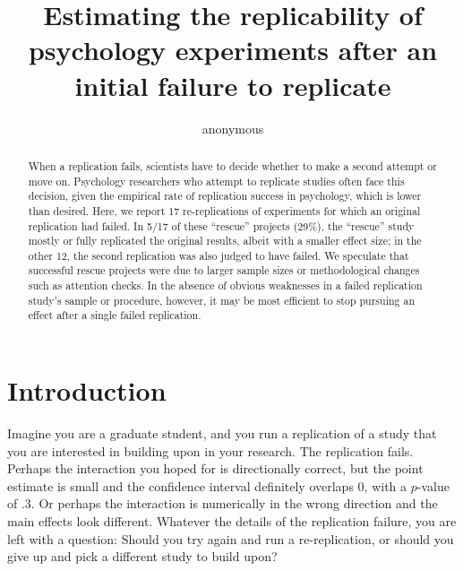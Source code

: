 \documentclass[
  english,
  a4paper,
]{article}
\title{Estimating the replicability of psychology experiments after an initial failure to replicate}
\affil[\addrlblbycode{#1}]{\MyRef{ADDRTXT}{#1}}}%
\author{anonymous}
\date{}
\begin{document}
\maketitle





\begin{otherlanguage}{english}

\begin{abstract}
When a replication fails, scientists have to decide whether to make a second attempt or move on.
Psychology researchers who attempt to replicate studies often face this decision, given the empirical rate of replication success in psychology, which is lower than desired.
Here, we report 17 re-replications of experiments for which an original replication had failed.
In 5/17 of these ``rescue'' projects (29\%), the ``rescue'' study mostly or fully replicated the original results, albeit with a smaller effect size; in the other 12, the second replication was also judged to have failed.
We speculate that successful rescue projects were due to larger sample sizes or methodological changes such as attention checks.
In the absence of obvious weaknesses in a failed replication study's sample or procedure, however, it may be most efficient to stop pursuing an effect after a single failed replication.

\end{abstract}

\end{otherlanguage}

\section{Introduction}\label{introduction}

Imagine you are a graduate student, and you run a replication of a study that you are interested in building upon in your research.
The replication fails.
Perhaps the interaction you hoped for is directionally correct, but the point estimate is small and the confidence interval definitely overlaps 0, with a \(p\)-value of .3.
Or perhaps the interaction is numerically in the wrong direction and the main effects look different.
Whatever the details of the replication failure, you are left with a question: Should you try again and run a re-replication, or should you give up and pick a different study to build upon?
\end{document}
